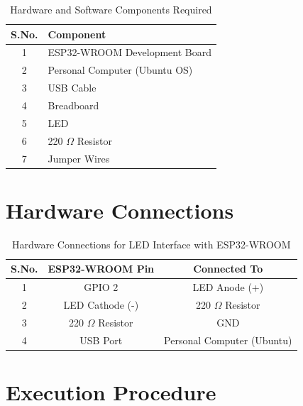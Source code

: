 \documentclass[12pt,a4paper]{article}
\begin{document}
\begin{table}[h]
\centering
\begin{tabular}{|c|l|}
\hline
\textbf{S.No.} & \textbf{Component} \\ \hline
1 & ESP32-WROOM Development Board \\ \hline
2 & Personal Computer (Ubuntu OS) \\ \hline
3 & USB Cable \\ \hline
4 & Breadboard \\ \hline
5 & LED \\ \hline
6 & 220 $\Omega$ Resistor \\ \hline
7 & Jumper Wires \\ \hline
\end{tabular}
\caption{Hardware and Software Components Required}
\label{tab:hardware}
\end{table}
\section*{Hardware Connections}

\begin{table}[h]
\centering
\begin{tabular}{|c|c|c|}
\hline
\textbf{S.No.} & \textbf{ESP32-WROOM Pin} & \textbf{Connected To} \\ \hline
1 & GPIO 2 & LED Anode (+) \\ \hline
2 & LED Cathode (-) & 220 $\Omega$ Resistor \\ \hline
3 & 220 $\Omega$ Resistor & GND \\ \hline
4 & USB Port & Personal Computer (Ubuntu) \\ \hline
\end{tabular}
\caption{Hardware Connections for LED Interface with ESP32-WROOM}
\label{tab:connections}
\end{table}

\section*{Execution Procedure}
\end{document}
